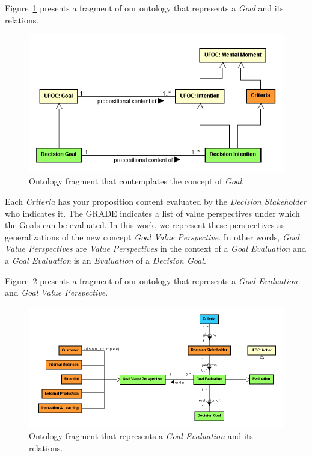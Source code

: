 Figure~\ref{fig-ontology-goals} presents a fragment of our ontology that represents a \textit{Goal} and its relations.

\begin{figure}
	\centering
	\includegraphics[width=\textwidth]{figuras/fig-ontology-goals} 
	\caption{Ontology fragment that contemplates the concept of \textit{Goal}.}
	\label{fig-ontology-goals}
\end{figure}

Each \textit{Criteria} has your proposition content evaluated by the \textit{Decision Stakeholder} who indicates it. The GRADE indicates a list of value perspectives under which the Goals can be evaluated. In this work, we represent these perspectives as generalizations of the new concept \textit{Goal Value Perspective}. In other words, \textit{Goal Value Perspectives} are \textit{Value Perspectives} in the context of a \textit{Goal Evaluation} and a \textit{Goal Evaluation} is an \textit{Evaluation} of a \textit{Decision Goal}.

Figure~\ref{fig-goal-evaluation} presents a fragment of our ontology that represents a \textit{Goal Evaluation} and \textit{Goal Value Perspective}.

\begin{figure}
	\centering
	\includegraphics[width=\textwidth]{figuras/fig-goal-evaluation} 
	\caption{Ontology fragment that represents a \textit{Goal Evaluation} and its relations.}
	\label{fig-goal-evaluation}
\end{figure}


